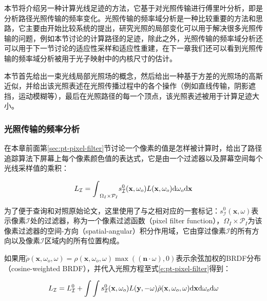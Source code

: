 本节将介绍另一种计算光线足迹的方法，它基于对光照传输进行傅里叶分析，即是分析路径光照传输的频率变化。光照传输的频率域分析是一种比较重要的方法和思路，它主要由\cite{a:AFrequencyAnalysisofLightTransport}开始比较系统的提出，研究光照的局部变化可以用于解决很多光照传输的问题，例如本节讨论的计算路径的足迹，除此之外，光照传输的频率域分析还可以用于下一节讨论的适应性采样和适应性重建，在下一章我们还可以看到光照传输的频率域分析被用于光子映射中的内核尺寸的估计。

本节首先给出一束光线局部光照场的概念，然后给出一种基于方差的光照场的高斯近似，并给出该光照表述在光照传播过程中的各个操作（例如直线传输，阴影遮挡，运动模糊等），最后在光照路径的每一个顶点，该光照表述被用于计算足迹大小。





\subsubsection{光照传输的频率分析}\label{sec:pt-frequency-analysis}
在本章前面第\ref{sec:pt-pixel-filter}节讨论一个像素的值是怎样被计算时，给出了路径追踪算法下屏幕上每个像素颜色值的表达式，它是由一个过滤器以及屏幕空间每个光线采样值的乘积：

\begin{equation}\label{e:pt-pixel-filter}
	L_{\mathcal{I}}={\rm \int}_{\Omega_I\times\mathcal{P}_I}s^{0}_{\mathcal{I}}(\mathbf{x},\omega_{o})L(\mathbf{x},\omega_{o}){\rm d}\omega_{o}{\rm d}\mathbf{x}
\end{equation}

\noindent 为了便于查询和对照原始论文，这里使用了与之相对应的一套标记：$s^{0}_{\mathcal{I}}(\mathbf{x},\omega)$表示像素$\mathcal{I}$处的过滤器，称为一个像素过滤函数（pixel filter function），$\Omega_I\times\mathcal{P}_I$为该像素过滤器的空间-方向（spatial-angular）积分作用域，它由穿过像素$\mathcal{I}$的所有方向以及像素$\mathcal{I}$区域内的所有位置构成。

如果用$\tilde{\rho}(\mathbf{x},\omega_o,\omega)=\rho (\mathbf{x},\omega_o,\omega)\max{((\mathbf{n}\cdot\omega),0)}$表示余弦加权的BRDF分布（cosine-weighted BRDF），并代入光照方程至式\ref{e:pt-pixel-filter}得到：

\begin{equation}
	L_{\mathcal{I}}=L^{0}_{\mathcal{I}}+{\rm \int}\int s^{0}_{\mathcal{I}}(\mathbf{x},\omega_{o})L(\mathbf{y},-\omega)\tilde{\rho}(\mathbf{x},\omega_o,\omega){\rm d}\mathbf{x}{\rm d}\omega_o {\rm d}\omega
\end{equation}

